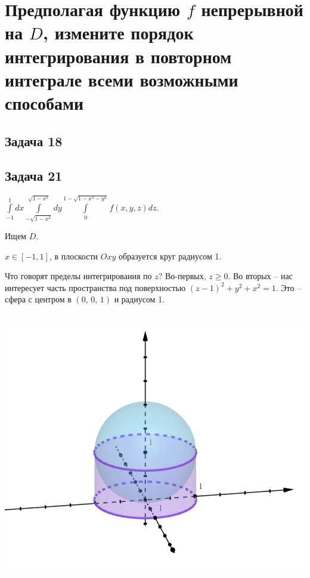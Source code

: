 \documentclass[a4paper, fleqn]{article}
\begin{document}
    
    \section*{Предполагая функцию $f$ непрерывной на $D$, измените порядок интегрирования в повторном интеграле
    всеми возможными способами}
    
    \subsection*{Задача 18}
    
    
    
    \subsection*{Задача 21}
    
    $\displaystyle \int\limits_{-1}^{1} dx \int\limits_{-\sqrt{1 - x^2}}^{\sqrt{1 - x^2}} dy \int\limits_{0}^{1 - \sqrt{1 - x^2 - y^2}} f(x,y,z) dz.$
    
    Ищем $D$. 
    
    $x \in [-1, 1]$, в плоскости $Oxy$ образуется круг радиусом 1.
    
    Что говорят пределы интегрирования по $z$? Во-первых, $z \geq 0$. Во вторых -- нас интересует часть пространства под поверхностью $(z-1)^2 + y^2 + x^2 = 1.$ Это -- сфера с центром в $(0, \, 0, \,1)$ и радиусом 1.
    
    \includegraphics[width=14cm, height=12cm]{task 21.png}
    
\end{document}
